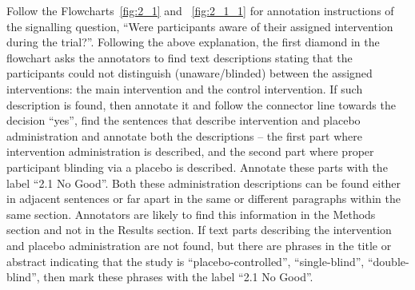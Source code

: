 \documentclass[sn-mathphys,Numbered]{sn-jnl}%
\begin{document}
Follow the Flowcharts~\ref{fig:2_1} and ~\ref{fig:2_1_1} for annotation instructions of the signalling question, ``Were participants aware of their assigned intervention during the trial?''.
Following the above explanation, the first diamond in the flowchart asks the annotators to find text descriptions stating that the participants could not distinguish (unaware/blinded) between the assigned interventions: the main intervention and the control intervention.
If such description is found, then annotate it and follow the connector line towards the decision ``yes'', find the sentences that describe intervention and placebo administration and annotate both the descriptions – the first part where intervention administration is described, and the second part where proper participant blinding via a placebo is described.
Annotate these parts with the label ``2.1 No Good''.
Both these administration descriptions can be found either in adjacent sentences or far apart in the same or different paragraphs within the same section.
Annotators are likely to find this information in the Methods section and not in the Results section. 
If text parts describing the intervention and placebo administration are not found, but there are phrases in the title or abstract indicating that the study is ``placebo-controlled'', ``single-blind'', ``double-blind'', then mark these phrases with the label ``2.1 No Good''.
\end{document}

